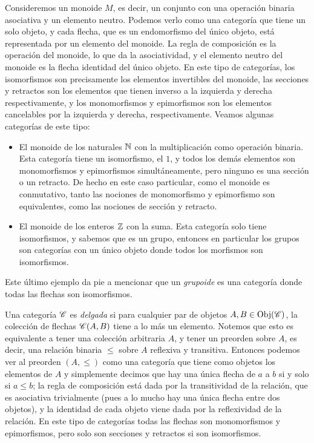 \documentclass{comunicaciones}
\begin{document}
\begin{ej}[Monoides]\label{Monoides}
    Consideremos un monoide $M$, es decir, un conjunto con una operación binaria asociativa y un elemento neutro. 
    Podemos verlo como una categoría que tiene un solo objeto, y cada flecha, que es un endomorfismo del único objeto, está representada por un elemento
    del monoide. La regla de composición es la operación del monoide, lo que da la asociatividad, y el elemento neutro del monoide es la flecha identidad
    del único objeto. En este tipo de categorías, los isomorfismos son precisamente los elementos invertibles del monoide, las secciones y retractos son los
    elementos que tienen inverso a la izquierda y derecha respectivamente, y los monomorfismos y epimorfismos son los elementos cancelables por la izquierda
    y derecha, respectivamente. Veamos algunas categorías de este tipo:
    \begin{itemize}
        \item El monoide de los naturales $\mathbb N$ con la multiplicación como operación binaria. Esta categoría tiene un isomorfismo, el $1$, y todos
        los demás elementos son monomorfismos y epimorfismos simultáneamente, pero ninguno es una sección o un retracto. De hecho en este caso particular, como
        el monoide es conmutativo, tanto las nociones de monomorfismo y epimorfismo son equivalentes, como las nociones de sección y retracto.
        \item El monoide de los enteros $\mathbb Z$ con la suma. Esta categoría solo tiene isomorfismos, y sabemos que es un grupo, entonces en particular 
        los grupos son categorías con un único objeto donde todos los morfismos son isomorfismos.
    \end{itemize}
    Este último ejemplo da pie a mencionar que un \emph{grupoide} es una categoría donde todas las flechas son isomorfismos.
\end{ej}

\begin{ej}\label{categoria delgada}
    Una categoría $\mathscr C$ es \emph{delgada} si para cualquier par de objetos $A,B\in\mathrm{Obj}(\mathscr C)$, la colección de flechas $\mathscr C(A,B)$ tiene a lo más un elemento.
    Notemos que esto es equivalente a tener una colección arbitraria $A$, y tener un preorden sobre $A$, es decir, una relación binaria $\leq$ sobre $A$ 
    reflexiva y transitiva. Entonces podemos ver al preorden $(A,\leq)$ como una categoría que tiene como objetos los elementos de $A$ y simplemente decimos que hay
    una única flecha de $a$ a $b$ si y solo si $a\leq b$; la regla de composición está dada por la transitividad de la relación, que es asociativa trivialmente 
    (pues a lo mucho hay una única flecha entre dos objetos), y la identidad de cada objeto viene dada por la reflexividad de la relación. En este tipo de categorías
    todas las flechas son monomorfismos y epimorfismos, pero solo son secciones y retractos si son isomorfismos.
\end{ej}
\end{document}

